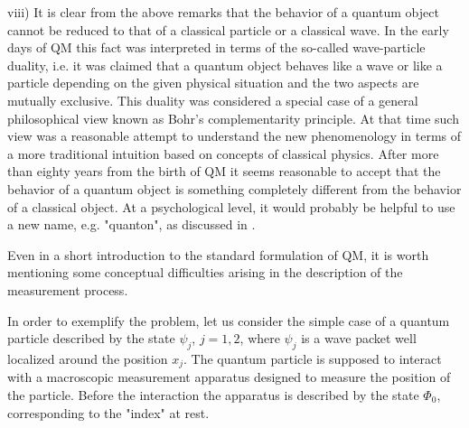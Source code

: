 \documentclass[12pt,reqno]{amsart}
\newcommand{\n}{\relax}
\newcommand{\vs}{\medskip}
\numberwithin{equation}{section}
\begin{document}
viii)  It is  clear from the above remarks that the behavior of a quantum object  cannot  be reduced to that of a classical particle or a classical wave.  In the early days of QM this fact was interpreted in terms of the so-called wave-particle duality, i.e. it was claimed that  a quantum object behaves like a   wave or like a particle depending on the given physical situation and the two aspects are mutually exclusive. This duality was considered a special case of a  general philosophical view known as Bohr's complementarity principle. At that time such view was a reasonable attempt to understand  the new  phenomenology in terms of a more traditional intuition based on concepts of classical physics.   After more than eighty years from the birth of QM  it seems reasonable to accept that the behavior of  a quantum object is something completely different from the behavior of a classical object. At a psychological  level,   it would  probably be  helpful   to use a new name, e.g.  "quanton", as discussed in \cite{bl}.




\vs
\n
Even in a short introduction to the standard formulation of QM, it is worth mentioning some conceptual difficulties arising in the description of the measurement process. 
 
 
\n 
In order to exemplify the problem, let us consider the simple case of a quantum particle described by the state $\psi_j$, $j=1,2$, where $\psi_j$ is a  wave packet well localized around the position $x_j$. The quantum particle is supposed to interact with a macroscopic measurement apparatus designed to measure the position of the particle. 
Before the interaction the apparatus is described by the state $\Phi_0$, corresponding to the "index" at rest.
 
\end{document}
